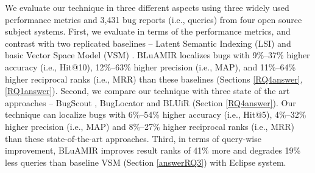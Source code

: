 \documentclass[conference]{IEEEtran}
\begin{document}

We evaluate our technique in three different aspects using
three widely used performance metrics and 3,431 bug reports (i.e.,
queries) from four open source subject systems. 
First, we evaluate in terms of the performance metrics, and contrast with two replicated baselines -- Latent Semantic Indexing (LSI) \cite{MarcusLSI} and basic Vector Space Model (VSM) \cite{vector-space-model}.
BLuAMIR localizes bugs with 9\%--37\% higher accuracy (i.e., Hit@10), 12\%--63\% higher precision (i.e., MAP), and 11\%--64\% higher reciprocal ranks (i.e., MRR) than these baselines (Sections \ref{RQ4answer}, \ref{RQ1answer}).
Second, we compare our technique with three state of the art approaches -- BugScout \cite{Nguyen}, BugLocator \cite{Jian} and BLUiR \cite{Saha} (Section \ref{RQ4answer}).
Our technique can localize bugs with 6\%--54\% higher accuracy (i.e., Hit@5), 4\%--32\% higher precision (i.e., MAP) and 8\%--27\% higher reciprocal ranks (i.e., MRR) than these state-of-the-art approaches.
Third, in terms of query-wise improvement, BLuAMIR improves result ranks of 41\% more and degrades 19\% less queries than baseline VSM (Section \ref{answerRQ3}) with Eclipse system.
\end{document}

